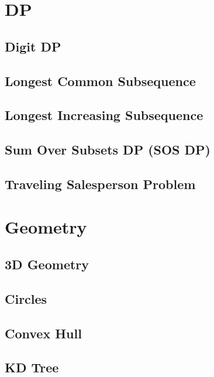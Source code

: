 \section{DP}
\subsection{Digit DP}
\raggedbottom
\hrulefill
\subsection{Longest Common Subsequence}
\raggedbottom
\hrulefill
\subsection{Longest Increasing Subsequence}
\raggedbottom
\hrulefill
\subsection{Sum Over Subsets DP (SOS DP)}
\raggedbottom
\hrulefill
\subsection{Traveling Salesperson Problem}
\raggedbottom
\hrulefill

\section{Geometry}
\subsection{3D Geometry}
\raggedbottom
\hrulefill
\subsection{Circles}
\raggedbottom
\hrulefill
\subsection{Convex Hull}
\raggedbottom
\hrulefill
\subsection{KD Tree}
\raggedbottom
\hrulefill
